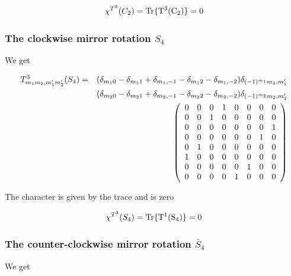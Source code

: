 \begin{equation}
\chi^{T^3}(C_2)=\rm Tr \{ T^3(C_2) \}=0
\end{equation}

\subsubsection{The clockwise mirror rotation $S_4$}

 We get

\begin{eqnarray}\label{S43}
T^3_{m_1m_2,m'_1m'_2}(S_4)&=&(\delta_{m_10}-\delta_{m_11}+\delta_{m_1,-1}-\delta_{m_12}-\delta_{m_1,-2})
\delta_{(-1)^{m_1}m_1,m'_1} \\ \nonumber
&&
(\delta_{m_20}-\delta_{m_21}+\delta_{m_2,-1}-\delta_{m_22}-\delta_{m_2,-2})
\delta_{(-1)^{m_2}m_2,m'_2} \\ \nonumber
&&\left (
\begin{array}{ccccccccc}
0 & 0 & 0 & 1 & 0 & 0 & 0 & 0\\
0 & 0 & 1 & 0 & 0 & 0 & 0 & 0\\
0 & 0 & 0 & 0 & 0 & 0 & 0 & 1\\
0 & 0 & 0 & 0 & 0 & 0 & 1 & 0\\ 
0 & 1 & 0 & 0 & 0 & 0 & 0 & 0\\ 
1 & 0 & 0 & 0 & 0 & 0 & 0 & 0\\ 
0 & 0 & 0 & 0 & 0 & 1 & 0 & 0\\ 
0 & 0 & 0 & 0 & 1 & 0 & 0 & 0\\ 
\end{array} \right )
\end{eqnarray}

The character is given by the trace and is zero

\begin{equation}
\chi^{T^3}(S_4)=\rm Tr \{ T^1(S_4) \}=0
\end{equation}


\subsubsection{The counter-clockwise mirror rotation $\bar S_4$}


We get


